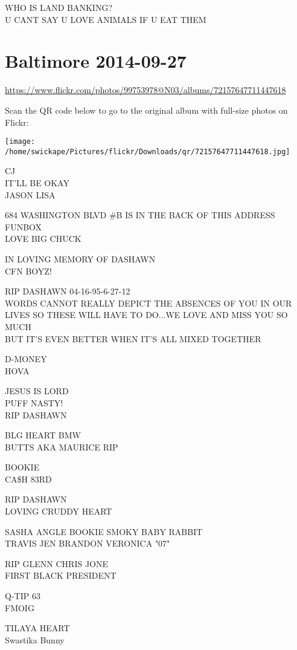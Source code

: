 \documentclass[10pt,letterpaper]{article}
\begin{document}
WHO IS LAND BANKING?\\
U CANT SAY U LOVE ANIMALS IF U EAT THEM
\pagebreak

\section*{Baltimore 2014-09-27}

\url{https://www.flickr.com/photos/99753978@N03/albums/72157647711447618}

Scan the QR code below to go to the original album with full-size photos on Flickr:

\texttt{[image: /home/swickape/Pictures/flickr/Downloads/qr/72157647711447618.jpg]}
\pagebreak

CJ\\
IT'LL BE OKAY\\
JASON LISA

684 WASHINGTON BLVD \#B IS IN THE BACK OF THIS ADDRESS\\
FUNBOX\\
LOVE BIG CHUCK

IN LOVING MEMORY OF DASHAWN\\
CFN BOYZ!

RIP DASHAWN 04{-}16{-}95{-}6{-}27{-}12\\
WORDS CANNOT REALLY DEPICT THE ABSENCES OF YOU IN OUR LIVES SO THESE WILL HAVE TO DO...WE LOVE AND MISS YOU SO MUCH\\
BUT IT'S EVEN BETTER WHEN IT'S ALL MIXED TOGETHER

D{-}MONEY\\
HOVA

JESUS IS LORD\\
PUFF NASTY!\\
RIP DASHAWN

BLG HEART BMW\\
BUTTS AKA MAURICE RIP

BOOKIE\\
CA\$H 83RD

RIP DASHAWN\\
LOVING CRUDDY HEART

SASHA ANGLE BOOKIE SMOKY BABY RABBIT\\
TRAVIS JEN BRANDON VERONICA "07"

RIP GLENN CHRIS JONE\\
FIRST BLACK PRESIDENT

Q{-}TIP 63\\
FMOIG

TILAYA HEART\\
Swastika Bunny
\end{document}
